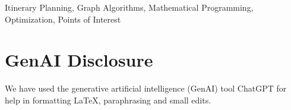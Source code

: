 \documentclass[conference]{IEEEtran}
\begin{document}
\begin{IEEEkeywords}
Itinerary Planning, Graph Algorithms, Mathematical Programming, Optimization, Points of Interest
\end{IEEEkeywords}









\pagebreak

\section*{GenAI Disclosure}
We have used the generative artificial intelligence (GenAI) tool ChatGPT for help in formatting \LaTeX{}, paraphrasing and small edits.

%


\end{document}
